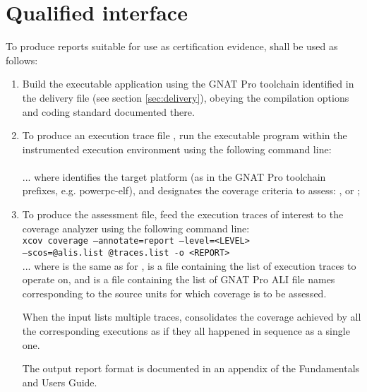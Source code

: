 \documentclass {report}
\begin{document}
\section{Qualified interface}
\label{sec:qual-interface}

To produce reports suitable for use as certification evidence, \xcov{} shall
be used as follows:

\begin{enumerate}
\item Build the executable application using the GNAT Pro toolchain identified
  in the delivery file (see section \ref{sec:delivery}), obeying the
  compilation options and coding standard documented there.

\item To produce an execution trace file , run the 
  executable program within the instrumented execution environment using the
  following command line:\\

 \\

... where  identifies the target platform (as in the GNAT Pro
toolchain prefixes, e.g.  powerpc-elf), and  designates the
coverage criteria to assess: ,  or ;

\item To produce the assessment  file, feed the execution traces
  of interest to the coverage analyzer using the following command line:\\

\texttt{xcov coverage --annotate=report --level=<LEVEL> \\
  --scos=@alis.list @traces.list -o <REPORT>} \\

... where  is the same as for ,  is a
file containing the list of execution traces to operate on, and 
is a file containing the list of GNAT Pro ALI file names corresponding to the
source units for which coverage is to be assessed.

When the  input lists multiple traces, \xcov{} consolidates the
coverage achieved by all the corresponding executions as if they all happened
in sequence as a single one.

The output report format is documented in an appendix of the \xcov{}
Fundamentals and Users Guide.

\end{enumerate}
\end{document}
